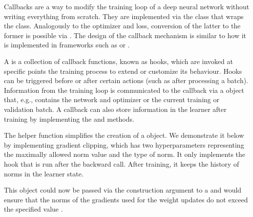 \documentclass[article]{jss}
\theoremstyle{definition}
\begin{document}
Callbacks are a way to modify the training loop of a deep neural network without writing everything from scratch.
They are implemented via the  class  that wraps the  class.
Analogously to the optimizer and loss, conversion of the latter to the former is possible via .
The design of the callback mechanism is similar to how it is implemented in frameworks such as \keras{} or \luz{} \citep{ref-chollet2018keras, ref-luz2023}.

A  is a collection of callback functions, known as hooks, which are invoked at specific points the training process to extend or customize its behaviour.
Hooks can be triggered before or after certain actions (such as after processing a batch).
Information from the training loop is communicated to the callback via a  object that, e.g., contains the network and optimizer or the current training or validation batch.
A callback can also store information in the learner after training by implementing the  and  methods.

The  helper function simplifies the creation of a  object.
We demonstrate it below by implementing gradient clipping, which has two hyperparameters representing the maximally allowed norm value and the type of norm.
It only implements the hook that is run after the backward call.
After training, it keeps the history of norms in the learner state.


This object could now be passed via the  construction argument to a  and would ensure that the norms of the gradients used for the weight updates do not exceed the specified value .
\end{document}
